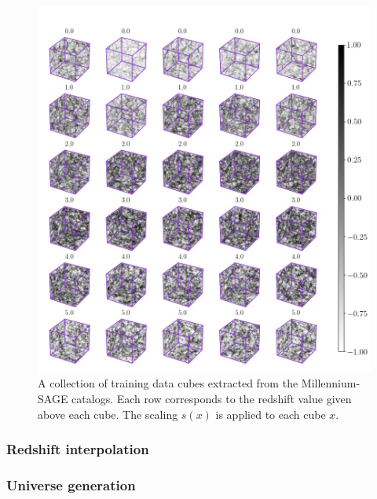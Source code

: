 \documentclass[twocolumn]{article}
\numberwithin{equation}{section}
\begin{document}
\begin{figure}[hbt!]
\includegraphics[width=15cm]{figures/cubes/classes3d.jpg}
\centering
\caption{A collection of training data cubes extracted from the Millennium-SAGE catalogs. Each row corresponds to the 
	 redshift value given above each cube. The scaling $s(x)$ is applied to each cube $x$.}
\label{fig:gan_game}
\end{figure}

\subsubsection{Redshift interpolation}

\subsubsection{Universe generation}
\end{document}
